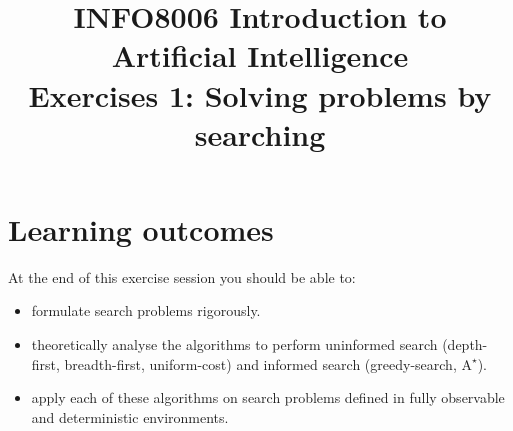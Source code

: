 \documentclass[9pt,a4paper]{extarticle}
\title{{\bf INFO8006 Introduction to Artificial Intelligence}\\[1em]
Exercises 1: Solving problems by searching}
\date{}
\begin{document}
\maketitle
\vspace{-4em}

  \section*{Learning outcomes}
  At the end of this exercise session you should be able to:
\begin{itemize}
   \item formulate search problems rigorously.
   \item theoretically analyse the algorithms to perform uninformed search (depth-first, breadth-first, uniform-cost) and informed search (greedy-search, $\text{A}^\star$).
   \item apply each of these algorithms on search problems defined in fully observable and deterministic environments.
\end{itemize}
\end{document}
